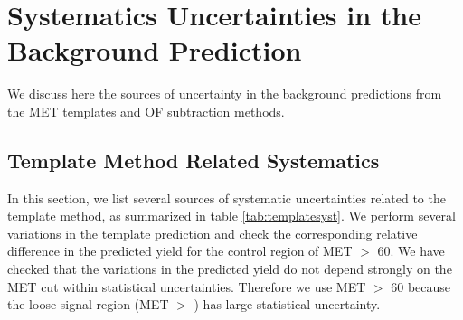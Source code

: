 \section{Systematics Uncertainties in the Background Prediction}
\label{sec:systematics}

We discuss here the sources of uncertainty in the background predictions from 
the MET templates and OF subtraction methods.

\subsection{Template Method Related Systematics}
\label{sec:systematicstemp}
In this section, we list several sources of systematic uncertainties related to the template method,
as summarized in table \ref{tab:templatesyst}. We perform several variations in the 
template prediction
and check the corresponding relative difference in the predicted yield for the 
control region of MET $>$ 60.
We have checked that the variations in the predicted yield do not depend strongly on the MET cut
within statistical uncertainties. 
Therefore we use MET $>$ 60 because the loose signal region (MET $>$ \signalmetl) has
large statistical uncertainty.

